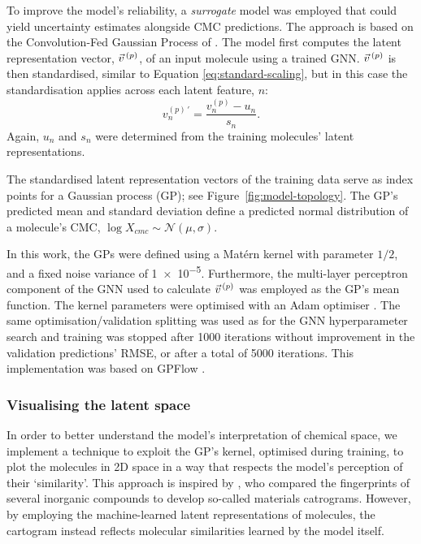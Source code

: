 To improve the model's reliability, a \emph{surrogate} model was employed that could yield uncertainty estimates alongside CMC predictions. The approach is based on the Convolution-Fed Gaussian Process of \citet{tranMethodsComparingUncertainty2020}. The model first computes the latent representation vector, $\vec{v}^{\,(p)}{}$, of an input molecule using a trained GNN. $\vec{v}^{\,(p)}{}$ is then standardised, similar to Equation \ref{eq:standard-scaling},
but in this case the standardisation applies across each latent feature, $n$:
\begin{equation}
    v^{(p)\,\prime}_n = \frac{v^{(p)}_n - u_n}{s_n}.
\end{equation}
Again, $u_n$ and $s_n$ were determined from the training molecules' latent representations.

The standardised latent representation vectors of the training data serve as index points for a Gaussian process (GP); see Figure~\ref{fig:model-topology}.
The GP's predicted mean and standard deviation define a predicted normal distribution of a molecule's CMC, $\log X_{cmc} \sim \mathcal{N}(\mu, \sigma)$.

In this work, the GPs  were defined using a Mat\'ern kernel with parameter $1/2$, and a fixed noise variance of \num{1e-5}. Furthermore, the multi-layer perceptron component of the GNN used to calculate $\vec{v}^{\,(p)}{}$ was employed as the GP's mean function.
The kernel parameters were optimised with an Adam optimiser \cite{kingmaAdamMethodStochastic2017a}.
The same optimisation/validation splitting was used as for the GNN hyperparameter search and training was stopped after \num{1000} iterations without improvement in the validation predictions' RMSE, or after a total of \num{5000} iterations. This implementation was based on GPFlow \cite{matthewsGPflowGaussianProcess2017}.

\subsubsection{Visualising the latent space}

In order to better understand the model's interpretation of chemical space, we
implement a technique to exploit the GP's kernel, optimised during training, to
plot the molecules in 2D space in a way that respects the model's perception of
their `similarity'. This approach is inspired by
\citeauthor{isayevMaterialsCartographyRepresenting2015}, who compared the
fingerprints of several inorganic compounds to develop so-called materials
catrograms. However, by employing the machine-learned latent representations of
molecules, the cartogram instead reflects molecular similarities learned by the
model itself.

